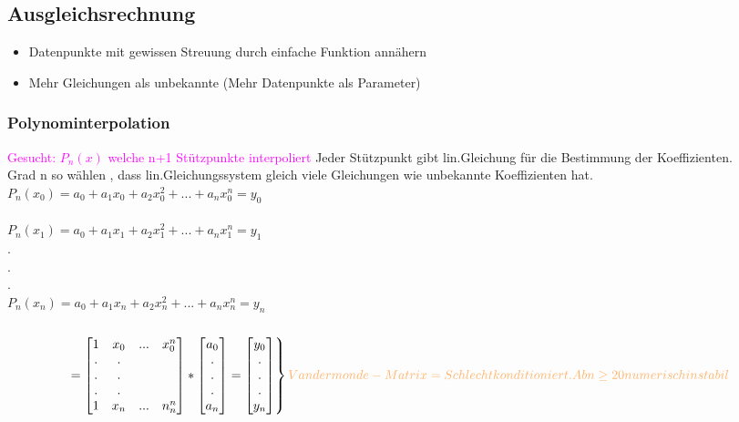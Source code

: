 \documentclass[../ZF_HM2.tex]{subfiles}
\begin{document}
\subsection{Ausgleichsrechnung}
\begin{itemize}
	\item Datenpunkte mit gewissen Streuung durch einfache Funktion annähern
	\item Mehr Gleichungen als unbekannte (Mehr Datenpunkte als Parameter)

\end{itemize}

\subsubsection{Polynominterpolation}
\textcolor {magenta} {Gesucht: $P_n(x)$ welche n+1 Stützpunkte interpoliert}
Jeder Stützpunkt gibt lin.Gleichung für die \colorbox {orange!30}{Bestimmung der Koeffizienten.}\\
\colorbox {green!30}{Grad n} so wählen , dass lin.Gleichungssystem gleich viele Gleichungen wie unbekannte Koeffizienten hat.\\
$P_n(x_0) = a_0 + a_1x_0 + a_2x_0^{2} + ... + a_nx_0^{n}=y_0$\\\\
$P_n(x_1) = a_0 + a_1x_1 + a_2x_1^{2} + ... + a_nx_1^{n}=y_1$\\
		.\\
		.\\
		.\\
$P_n(x_n) = a_0 + a_1x_n + a_2x_n^{2} + ... + a_nx_n^{n}=y_n$\\\\


\[
\begin{rcases*}
 = \left[\begin {matrix}1 & x_0 & ... & x_0^{n}\\
.&.\\
.&.\\
.&.\\
1 & x_n &...& n_n^{n}\end{matrix}\right] *
 \left[\begin {matrix}a_0\\
.\\
.\\
.\\
a_n\end{matrix}\right]
= \left[\begin {matrix}y_0\\
.\\
.\\
.\\
y_n\end{matrix}\right] 
\end{rcases*}\textcolor {orange!60}{Van der monde-Matrix = Schlecht konditioniert.
Ab n \geq 20 numerisch instabil}
\]
\end{document}
